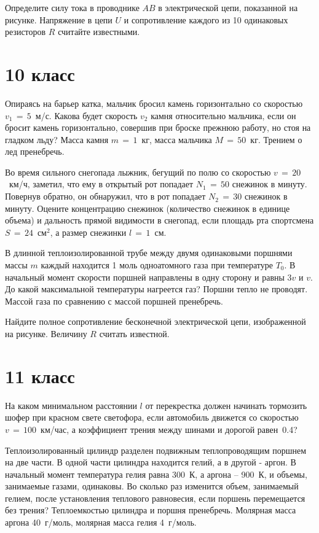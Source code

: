 \AddProb Определите силу тока в проводнике $AB$ в электрической цепи, показанной на рисунке. 
Напряжение в цепи $U$ и сопротивление каждого из 10 одинаковых резисторов $R$ считайте известными.



\section{10 класс}

\AddProb Опираясь на барьер катка, мальчик бросил камень горизонтально со скоростью $v_1\,=\,5$~м/с. 
Какова будет скорость $v_2$ камня относительно мальчика, если он бросит камень горизонтально, совершив при броске прежнюю работу, 
но стоя на гладком льду? Масса камня $m\,=\,1$~кг, масса мальчика $M\,=\,50$~кг. Трением о лед пренебречь.

\AddProb Во время сильного снегопада лыжник, бегущий по полю со скоростью $v\,=\,20$~км/ч, заметил, что ему в открытый рот попадает $N_1\,=\,50$ снежинок 
в минуту. Повернув обратно, он обнаружил, что в рот попадает $N_2\,=\,30$ снежинок в минуту. 
Оцените концентрацию снежинок (количество снежинок в единице объема) и дальность прямой видимости в снегопад, 
если площадь рта спортсмена $S\,=\,24$~см$^2$, а размер снежинки $l\,=\,1$~см.

\AddProb В длинной теплоизолированной трубе между двумя одинаковыми поршнями массы $m$ каждый находится 1 моль одноатомного газа при температуре $T_0$. 
В начальный момент скорости поршней направлены в одну сторону и равны $3v$ и $v$. До какой максимальной температуры нагреется газ? 
Поршни тепло не проводят. Массой газа по сравнению с массой поршней пренебречь.

\AddProb Найдите полное сопротивление бесконечной электрической цепи, изображенной на рисунке. Величину $R$ считать известной.



\section{11 класс}

\AddProb На каком минимальном расстоянии $l$ от перекрестка должен начинать тормозить шофер при красном свете светофора, 
если автомобиль движется со скоростью $v\,=\,100$~км/час, а коэффициент трения между шинами и дорогой равен~0.4?

\AddProb Теплоизолированный цилиндр разделен подвижным теплопроводящим поршнем на две части. В одной части цилиндра находится гелий, а в другой - аргон. 
В начальный момент температура гелия равна 300~К, а аргона -- 900~К, и объемы, занимаемые газами, одинаковы. 
Во сколько раз изменится объем, занимаемый гелием, после установления теплового равновесия, если поршень перемещается без трения? 
Теплоемкостью цилиндра и поршня пренебречь. Молярная масса аргона 40~г/моль, молярная масса гелия 4~г/моль.

